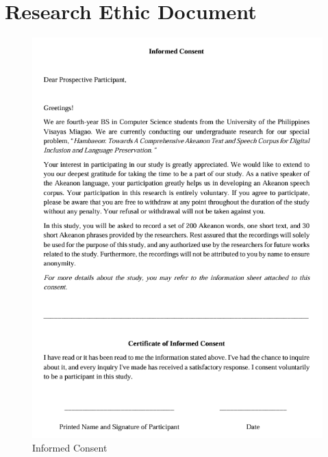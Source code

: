 %
%
%                 

\chapter{Research Ethic Document}
\label{sec:appendixa}

\begin{figure}[h!]
	\centering
	\includegraphics[width=\textwidth]{./appendix/informed_consent.png}
	\caption{Informed Consent}
	\label{fig:informedConsent}
\end{figure}

